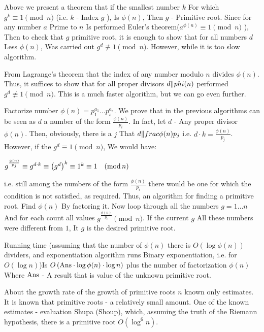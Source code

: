 Above we present a theorem that if the smallest number $k$ For which $g ^ k \equiv 1 \pmod {n}$ (i.e. $k$ - Index $g$ ), Is $\phi (n)$, Then $g$ - Primitive root. Since for any number $a$ Prime to $n$ Is performed Euler's theorem($a ^ {\phi (n)} \equiv 1 \pmod {n}$ ), Then to check that $g$ primitive root, it is enough to show that for all numbers $d$ Less $\phi (n)$, Was carried out $g ^ d \not \equiv 1 \pmod {n}$. However, while it is too slow algorithm.

From Lagrange's theorem that the index of any number modulo $n$ divides $\phi (n)$. Thus, it suffices to show that for all proper divisors $d \| \\phi (n)$ performed $g ^ d \not \equiv 1 \pmod {n}$. This is a much faster algorithm, but we can go even further.

Factorize number $\phi (n) = p_1 ^ {a_1} \ldots p_s ^ {a_s}$. We prove that in the previous algorithms can be seen as $d$ a number of the form $\frac {\phi (n)} {p_i}$. In fact, let $d$ - Any proper divisor $\phi (n)$. Then, obviously, there is a $j$ That $d \| \\frac {\phi (n)} {p_j}$ i.e. $d \cdot k = \frac {\phi (n)} {p_j}$. However, if the $g ^ d \equiv 1 \pmod {n}$, We would have:

$g^{\frac{\phi(n)}{p_{j}}}\equiv g^{d\cdot k}\equiv\left(g^{d}\right)^{k}\equiv1^{k}\equiv1\quad({\rm mod\,}n)$

i.e. still among the numbers of the form $\frac {\phi (n)} {p_i}$ there would be one for which the condition is not satisfied, as required.
Thus, an algorithm for finding a primitive root. Find $\phi (n)$ By factoring it. Now loop through all the numbers $g = 1 \ldots n$ And for each count all values $g ^ {\frac {\phi (n)} {p_i}} \pmod {n}$. If the current $g$ All these numbers were different from $1$, It $g$ is the desired primitive root.

Running time (assuming that the number of $\phi (n)$ there is $O \left (\log \phi (n) \right)$ dividers, and exponentiation algorithm runs Binary exponentiation, i.e. for $O (\log n)$)Is $O \left ({\rm Ans} \cdot \log \phi (n) \cdot \log n \right)$ plus the number of factorization $\phi (n)$ Where $\rm Ans$ - A result that is value of the unknown primitive root.

About the growth rate of the growth of primitive roots $n$ known only estimates. It is known that primitive roots - a relatively small amount. One of the known estimates - evaluation Shupa (Shoup), which, assuming the truth of the Riemann hypothesis, there is a primitive root $O (\log ^ 6 n)$.

